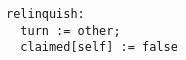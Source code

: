 \begin{questions}
\begin{subquestions}
\begin{modelanswer}
\begin{verbatim}
relinquish:
  turn := other;
  claimed[self] := false
\end{verbatim}
\end{modelanswer}
\end{subquestions}
\end{questions}




